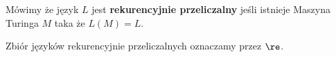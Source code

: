 
\begin{definition}
    Mówimy że język \( L \) jest \textbf{rekurencyjnie przeliczalny} jeśli istnieje Maszyna Turinga \( M \) taka że \( L(M) = L \).
    
    Zbiór języków rekurencyjnie przeliczalnych oznaczamy przez \( \re \).
\end{definition}

